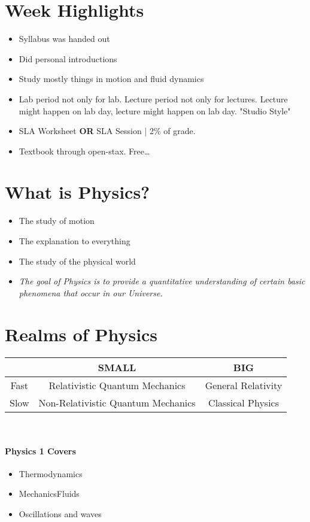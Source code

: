 \documentclass[]{article}
\title{\docTitle}
\author{\docAuthor\\Instructor: Dr. Thaya}
\begin{document}
\maketitle
\section*{Week Highlights}
\begin{itemize}
    \item Syllabus was handed out
    \item Did personal introductions
    \item Study mostly things in motion and fluid dynamics
    \item Lab period not only for lab. Lecture period not only for lectures.
            Lecture might happen on lab day, lecture might happen on lab day. "Studio Style"
    \item SLA Worksheet \textbf{OR} SLA Session | 2\% of grade.
    \item Textbook through open-stax. Free\dots
\end{itemize}

\section*{What is Physics?}
\begin{itemize}
    \item The study of motion
    \item The explanation to everything
    \item The study of the physical world
    \item \textit{The goal of Physics is to provide a quantitative understanding of certain basic phenomena that occur in our Universe.}
\end{itemize}

\section*{Realms of Physics}
\begin{tabular}{|c|c|c|}
    \hline
    &SMALL & BIG\\
    \hline
    Fast&Relativistic Quantum Mechanics&General Relativity\\
    Slow&Non-Relativistic Quantum Mechanics&Classical Physics\\
    \hline
\end{tabular}
\\
\paragraph*{Physics 1 Covers}
\begin{itemize}
\item Thermodynamics
\item MechanicsFluids
\item Oscillations and waves
\end{itemize}
\end{document}
